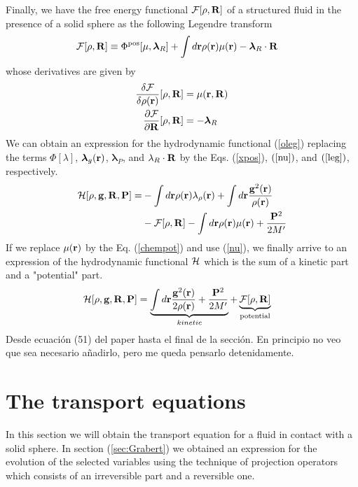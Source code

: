 \documentclass[a4paper,openright,12pt]{book}
\newcommand{\Pendiente}[1]{{\color{green}#1}} %
\begin{document}
Finally, we have the free energy functional ${\cal  F}[\rho,{\bf R}]$ of a structured fluid in the presence of a solid sphere as the following Legendre transform
\begin{align}
  {\cal F}[\rho,{\bf R}]&\equiv  \Phi^{\rm pos}[\mu,\boldsymbol{\lambda}_R]
+
\int d{\bf r}\rho({\bf r})\mu({\bf r})-\boldsymbol{\lambda}_R\cdot{\bf R}
\label{leg}
\end{align}
whose derivatives are given by 
\begin{align}
   \frac{\delta {\cal F}}{\delta\rho({\bf r})}[\rho,{\bf R}] &=\mu({\bf r},{\bf R})
\nonumber\\
   \frac{\partial {\cal F}}{\partial{\bf R}}[\rho,{\bf R}] &=-\boldsymbol{\lambda}_R
\label{Fd2}
\end{align}
We can obtain an expression for the  hydrodynamic functional (\ref{oleg}) replacing the terms $\Phi[\lambda]$, $\boldsymbol{\lambda}_g({\bf r})$, $\boldsymbol{\lambda}_P$, and $\lambda_R\cdot{\bf R}$ by the Eqs. (\ref{xpos}), $(\ref{nu})$, and $(\ref{leg})$, respectively. 
\begin{align}
  {\cal H}[\rho,{\bf g},{\bf R},{\bf P}] =& 
  -\int d{\bf r} \rho({\bf r})\lambda_{\rho}({\bf r}) 
  +\int d{\bf r}\frac{{\bf g}^2({\bf r})}{\rho({\bf r})} 
  \nonumber\\
  &- {\cal F}[\rho,{\bf R}] -\int d{\bf r}\rho({\bf r})\mu({\bf r}) + \frac{{\bf P}^2}{2M'}
\end{align}
If we replace $\mu({\bf r})$ by the Eq. (\ref{chempot}) and use (\ref{nu}), we finally arrive to an expression of the hydrodynamic functional ${\cal H}$ which is the sum of a kinetic part and a "potential" part. 
\begin{align}
  {\cal H}[\rho,{\bf g},{\bf R},{\bf P}] &=   
  \underbrace{\int d{\bf r}\frac{{\bf g}^2({\bf r})}{2\rho({\bf r})} +\frac{{\bf P}^2}{2M'}}_{kinetic}
  +\underbrace{{\cal F}[\rho,{\bf R}]}_{\rm potential}
\label{oleg2}
\end{align}
\Pendiente{Desde ecuación (51) del paper hasta el final de la sección. En principio no veo que sea necesario añadirlo, pero me queda pensarlo detenidamente.}

\section{The transport equations}
In this section we will obtain the transport equation for a fluid in contact with a solid sphere. In section (\ref{sec:Grabert}) we obtained an expression for the evolution of the selected variables using the technique of projection operators which consists of an irreversible part and a reversible one. 
\end{document}
